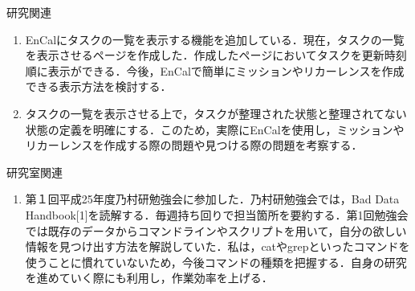 \documentclass[fleqn, 14pt]{extarticlej}
\renewcommand\labelenumi{(\theenumi)}
\begin{document}
\begin{description}
  \itemsep -1mm

\item[　2.1] 研究関連
  \vspace{-0.8em}
  \begin{enumerate}
    \renewcommand{\labelenumi}{(1)}
  \item EnCalにタスクの一覧を表示する機能を追加している．現在，タスクの一覧を表示させるページを作成した．作成したページにおいてタスクを更新時刻順に表示ができる．今後，EnCalで簡単にミッションやリカーレンスを作成できる表示方法を検討する．\\
  
	\renewcommand{\labelenumi}{(2)}
  \item 
タスクの一覧を表示させる上で，タスクが整理された状態と整理されてない状態の定義を明確にする．このため，実際にEnCalを使用し，ミッションやリカーレンスを作成する際の問題や見つける際の問題を考察する．\\
  
  \end{enumerate}
\newpage
  \vspace{-0.5em}
  \item[　2.2] 研究室関連
    \vspace{-1.0em}
    \begin{enumerate}
      \renewcommand{\labelenumi}{(1)}
    \item 第１回平成25年度乃村研勉強会に参加した．乃村研勉強会では，Bad Data Handbook[1]を読解する．毎週持ち回りで担当箇所を要約する．第1回勉強会では既存のデータからコマンドラインやスクリプトを用いて，自分の欲しい情報を見つけ出す方法を解説していた．私は，catやgrepといったコマンドを使うことに慣れていないため，今後コマンドの種類を把握する．自身の研究を進めていく際にも利用し，作業効率を上げる．
    
    
    \end{enumerate}

\end{description}

\vspace{-1.5em}
\end{document}
